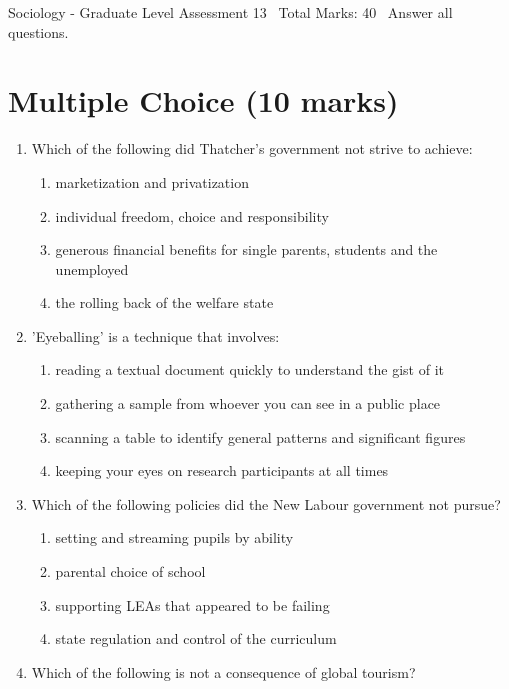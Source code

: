 \documentclass[12pt]{article}
\begin{document}
\begin{center}
Sociology - Graduate Level Assessment 13 \
Total Marks: 40 \
Answer all questions.
\end{center}

\section*{Multiple Choice (10 marks)}
\begin{enumerate}[label=\arabic*.]
\item Which of the following did Thatcher's government not strive to achieve:
\begin{enumerate}[label=(\alph*)]
    \item marketization and privatization
    \item individual freedom, choice and responsibility
    \item generous financial benefits for single parents, students and the unemployed
    \item the rolling back of the welfare state
\end{enumerate}
\item 'Eyeballing' is a technique that involves:
\begin{enumerate}[label=(\alph*)]
    \item reading a textual document quickly to understand the gist of it
    \item gathering a sample from whoever you can see in a public place
    \item scanning a table to identify general patterns and significant figures
    \item keeping your eyes on research participants at all times
\end{enumerate}
\item Which of the following policies did the New Labour government not pursue?
\begin{enumerate}[label=(\alph*)]
    \item setting and streaming pupils by ability
    \item parental choice of school
    \item supporting LEAs that appeared to be failing
    \item state regulation and control of the curriculum
\end{enumerate}
\item Which of the following is not a consequence of global tourism?
\begin{enumerate}[label=(\alph*)]

\end{enumerate}
\end{enumerate}
\end{document}
